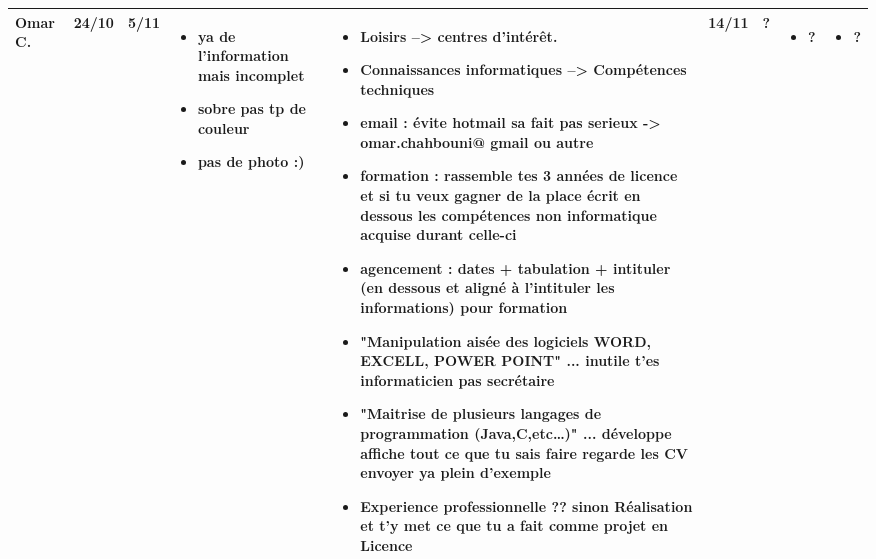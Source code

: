 \documentclass[a4paper,11pt]{article}
\begin{document}
\begin{landscape}
\begin{longtable}{|l|l|l|p{4cm}|p{4cm}|l|l|p{4cm}|p{4cm}|}
    Omar C. & 24/10 & 5/11
	    & \begin{itemize}
	      \item ya de l'information mais incomplet
	      \item sobre pas tp de couleur
	      \item pas de photo :)
	      \end{itemize}
	    & \begin{itemize}
	      \item Loisirs --> centres d'intérêt.
	      \item Connaissances informatiques --> Compétences techniques
	      \item email : évite hotmail sa fait pas serieux -> omar.chahbouni@ gmail ou autre
	      \item formation : rassemble tes 3 années de licence et si tu veux gagner de la place écrit en dessous les compétences non informatique acquise durant celle-ci
	      \item agencement  : dates  + tabulation + intituler (en dessous et aligné à l'intituler les informations) pour formation
	      \item "Manipulation aisée des logiciels WORD, EXCELL, POWER POINT" ... inutile t'es informaticien pas secrétaire
	      \item "Maitrise de plusieurs langages de programmation (Java,C,etc…)" ... développe affiche tout ce que tu sais faire regarde les CV envoyer ya plein d'exemple
	      \item Experience professionnelle ?? sinon Réalisation et t'y met ce que tu a fait comme projet en Licence
	      \end{itemize}
	    & 14/11 & ?
	    & \begin{itemize}
	      \item ?
	      \end{itemize}
	    & \begin{itemize}
	      \item ?
	      \end{itemize} \\ \hline


\end{longtable}
\end{landscape}
\end{document}
